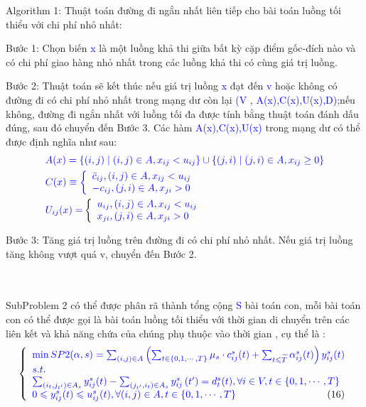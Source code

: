 \documentclass[a4paper]{article}
\begin{document}
Algorithm 1: Thuật toán đường đi ngắn nhất liên tiếp cho bài toán luồng tối thiểu với chi phí nhỏ nhất:\\
\begin{minipage}{0.8\textwidth}
\setlength{\parindent}{20pt}
Bước 1: Chọn biến \textcolor{blue}{x} là một luồng khả thi giữa bất kỳ cặp điểm gốc-đích nào và có chi phí giao hàng nhỏ nhất trong các luồng khả thi có cùng giá trị luồng.

Bước 2: Thuật toán sẽ kết thúc nếu giá trị luồng \textcolor{blue}{x} đạt đến \textcolor{blue}{v} hoặc không có đường đi có chi phí nhỏ nhất trong mạng dư còn lại \textcolor{blue}{(V , A(x),C(x),U(x),D)};nếu không, đường đi ngắn nhất với luồng tối đa được tính bằng thuật toán đánh dấu đúng, sau đó chuyển đến  Bước 3. Các hàm \textcolor{blue}{A(x),C(x),U(x)} trong mạng dư có thể được định nghĩa như sau:
$$
\begin{aligned}
& \textcolor{blue}{A(x)=\left\{(i, j) \mid(i, j) \in A, x_{i j}<u_{i j}\right\} \cup\left\{(j, i) \mid(j, i) \in A, x_{i j} \geq 0\right\}} \\
& \textcolor{blue}{C(x) \equiv\left\{\begin{array}{l}
\bar{c}_{i j},(i, j) \in A, x_{i j}<u_{i j} \\
-c_{i j},(j, i) \in A, x_{j i}>0
\end{array}\right.} \\
&\textcolor{blue}{ U_{i j}(x)=}\left\{\begin{array}{l}
\textcolor{blue}{u_{i j},(i, j) \in A, x_{i j}<u_{i j}} \\
\textcolor{blue}{x_{j i},(j, i) \in A, x_{j i}>0}
\end{array}\right.
\end{aligned}
$$

Bước 3: Tăng giá trị luồng trên đường đi có chi phí nhỏ nhất. Nếu giá trị luồng tăng không vượt quá v, chuyển đến Bước 2.
\end{minipage}\\
\\
SubProblem 2 có thể được phân rã thành tổng cộng \textcolor{blue}{S} bài toán con, mỗi bài toán con có thể được gọi là bài toán luồng tối thiểu với thời gian di chuyển trên các liên kết và khả năng chứa của chúng phụ thuộc vào thời gian , cụ thể là : \\
$$
\left\{\begin{array}{l}
\textcolor{blue}{\min S P 2(\alpha, s)=\sum_{(i, j) \in A}\left(\sum_{t \in\{0,1, \cdots, T\}} \mu_s \cdot c_{i j}^s(t)+\sum_{t \leqslant \widetilde{T}} \alpha_{i j}^s(t)\right) y_{i j}^s(t)} \\
\textcolor{blue}{s . t . }\\
\textcolor{blue}{\sum_{\left(i_{t}, j_{t'}\right) \in A_s} y_{i j}^s(t)-\sum_{\left(j_{t'}, i_t\right) \in A_s} y_{i j}^s\left(t^{\prime}\right)=d_t^s(t), \forall i \in V, t \in\{0,1, \cdots, T\}} \\
\textcolor{blue}{0 \leqslant y_{i j}^s(t) \leqslant u_{i j}^s(t), \forall(i, j) \in A, t \in\{0,1, \cdots, T\}}
\hfill {(16)}
\end{array}\right.
$$
\end{document}
